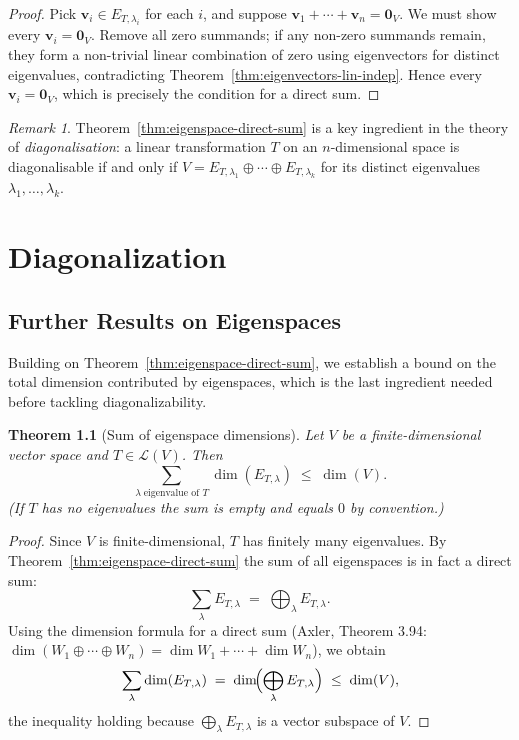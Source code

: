 \documentclass[11pt, a4paper, notitlepage]{report}
\newtheorem{theorem}{Theorem}[section]
\theoremstyle{definition}
\theoremstyle{remark}
\newtheorem{remark}[theorem]{Remark}
\begin{document}
\begin{proof}
Pick $\mathbf{v}_i \in E_{T,\lambda_i}$ for each $i$, and suppose $\mathbf{v}_1 + \cdots +
\mathbf{v}_n = \mathbf{0}_V$. We must show every $\mathbf{v}_i = \mathbf{0}_V$. Remove all
zero summands; if any non-zero summands remain, they form a non-trivial linear combination of
zero using eigenvectors for distinct eigenvalues, contradicting
Theorem~\ref{thm:eigenvectors-lin-indep}. Hence every $\mathbf{v}_i = \mathbf{0}_V$, which
is precisely the condition for a direct sum.
\end{proof}

\begin{remark}
Theorem~\ref{thm:eigenspace-direct-sum} is a key ingredient in the theory of
\emph{diagonalisation}: a linear transformation $T$ on an $n$-dimensional space is
diagonalisable if and only if $V = E_{T,\lambda_1} \oplus \cdots \oplus E_{T,\lambda_k}$
for its distinct eigenvalues $\lambda_1, \ldots, \lambda_k$.
\end{remark}

\chapter{Diagonalization}
\label{chap:week9}

\section{Further Results on Eigenspaces}
\label{sec:eigenspace-further}

Building on Theorem~\ref{thm:eigenspace-direct-sum}, we establish a bound on the total
dimension contributed by eigenspaces, which is the last ingredient needed before tackling
diagonalizability.

\begin{theorem}[Sum of eigenspace dimensions]
\label{thm:eigenspace-dim-sum}
Let $V$ be a finite-dimensional vector space and $T \in \mathcal{L}(V)$. Then
\[
  \sum_{\lambda\;\text{eigenvalue of }T} \dim(E_{T,\lambda}) \;\leq\; \dim(V).
\]
(If $T$ has no eigenvalues the sum is empty and equals $0$ by convention.)
\end{theorem}

\begin{proof}
Since $V$ is finite-dimensional, $T$ has finitely many eigenvalues. By
Theorem~\ref{thm:eigenspace-direct-sum} the sum of all eigenspaces is in fact a direct sum:
\[
  \sum_{\lambda} E_{T,\lambda} \;=\; \bigoplus_{\lambda} E_{T,\lambda}.
\]
Using the dimension formula for a direct sum (Axler, Theorem 3.94:
$\dim(W_1 \oplus \cdots \oplus W_n) = \dim W_1 + \cdots + \dim W_n$), we obtain
\[
  \sum_{\lambda} \dim(E_{T,\lambda})
  \;=\; \dim\!\Bigl(\bigoplus_{\lambda} E_{T,\lambda}\Bigr)
  \;\leq\; \dim(V),
\]
the inequality holding because $\bigoplus_\lambda E_{T,\lambda}$ is a vector subspace of $V$.
\end{proof}
\end{document}
